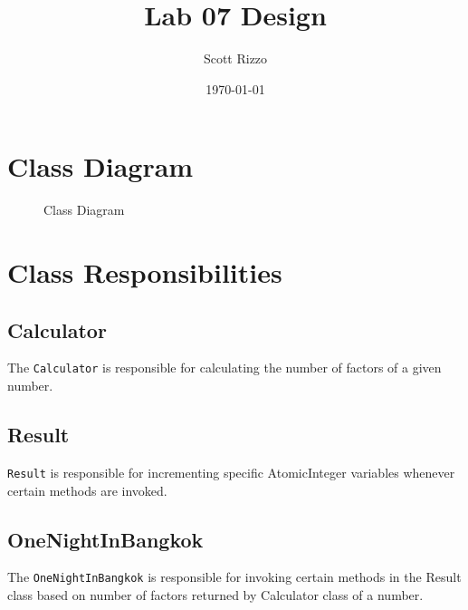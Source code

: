 \documentclass{article}
\title{Lab 07 Design}
\author{Scott Rizzo}
\date{\today}
\begin{document}
\maketitle

\section{Class Diagram}
\begin{figure}[H]
\caption{Class Diagram}
\label{fig:Hollow Star}
\end{figure}

\section{Class Responsibilities}
\subsection{Calculator}
The \texttt{Calculator} is responsible for calculating the number of factors of a given number.

\subsection{Result}
\texttt{Result} is responsible for incrementing specific AtomicInteger variables whenever certain methods are invoked.

\subsection{OneNightInBangkok}
The \texttt{OneNightInBangkok} is responsible for invoking certain methods in the Result class based on number of factors returned by Calculator class of a number.
\end{document}
